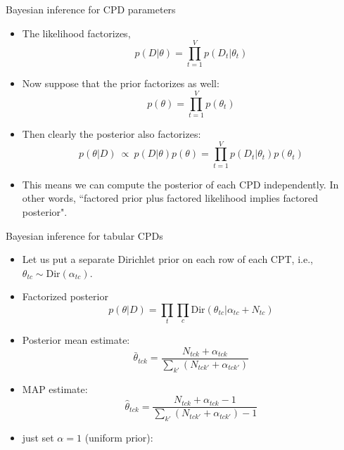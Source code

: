 \documentclass[10pt,mathserif]{beamer}
\begin{document}
\begin{frame}{Bayesian inference for CPD parameters}
\begin{itemize}
    \item The likelihood factorizes,
    \begin{equation}
        p(D|\theta) = \prod_{t=1}^V p(D_t|\theta_t)
    \end{equation}
    
    \item Now suppose that the prior factorizes as well:
    \begin{equation}
        p(\theta) = \prod_{t=1}^V p(\theta_t)
    \end{equation}
    
    \item Then clearly the posterior also factorizes:
    \begin{equation}
        p(\theta|D)  \ \propto \ p(D|\theta) p(\theta) = \prod_{t=1}^V p(D_t|\theta_t)p(\theta_t)
    \end{equation}
    
    \item  This means we can compute the posterior of each CPD independently. In other words, ``factored prior plus factored likelihood implies factored posterior".
\end{itemize}
\end{frame}

\begin{frame}{Bayesian inference for tabular CPDs}
\begin{itemize}
    \item Let us put a separate Dirichlet prior on each row of each CPT, i.e., $\theta_{tc} \sim \text{Dir}(\alpha_{tc})$.
    
    \item Factorized posterior
    \begin{equation}
        p(\theta|D) = \prod_t\prod_c\text{Dir}(\theta_{tc}|\alpha_{tc} + N_{tc})
    \end{equation}
    
    \item Posterior mean estimate:
    \begin{equation}
        \bar{\theta}_{tck}   = \frac{N_{tck} + \alpha_{tck}}{\sum_{k'}(N_{tck'} + \alpha_{tck'})}
    \end{equation}
    
    \item  MAP estimate:
    \begin{equation}
        \hat{\theta}_{tck}   = \frac{N_{tck} + \alpha_{tck} -1 }{\sum_{k'}(N_{tck'} + \alpha_{tck'}) -1}
    \end{equation}
    
    \item just set $\alpha = 1$ (uniform prior):
\end{itemize}
\end{frame}
\end{document}
